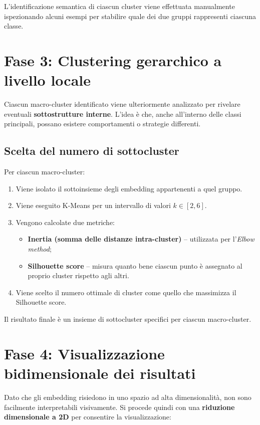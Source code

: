 \documentclass[a4paper,11pt]{article}
\begin{document}
L'identificazione semantica di ciascun cluster viene effettuata manualmente ispezionando alcuni esempi per stabilire quale dei due gruppi rappresenti ciascuna classe.

\section{Fase 3: Clustering gerarchico a livello locale}

Ciascun macro-cluster identificato viene ulteriormente analizzato per rivelare eventuali \textbf{sottostrutture interne}. L’idea è che, anche all’interno delle classi principali, possano esistere comportamenti o strategie differenti.

\subsection{Scelta del numero di sottocluster}

Per ciascun macro-cluster:
\begin{enumerate}
    \item Viene isolato il sottoinsieme degli embedding appartenenti a quel gruppo.
    \item Viene eseguito K-Means per un intervallo di valori $k \in [2, 6]$.
    \item Vengono calcolate due metriche:
        \begin{itemize}
            \item \textbf{Inertia (somma delle distanze intra-cluster)} – utilizzata per l’\emph{Elbow method};
            \item \textbf{Silhouette score} – misura quanto bene ciascun punto è assegnato al proprio cluster rispetto agli altri.
        \end{itemize}
    \item Viene scelto il numero ottimale di cluster come quello che massimizza il Silhouette score.
\end{enumerate}

Il risultato finale è un insieme di sottocluster specifici per ciascun macro-cluster.

\section{Fase 4: Visualizzazione bidimensionale dei risultati}

Dato che gli embedding risiedono in uno spazio ad alta dimensionalità, non sono facilmente interpretabili visivamente. Si procede quindi con una \textbf{riduzione dimensionale a 2D} per consentire la visualizzazione:
\end{document}
